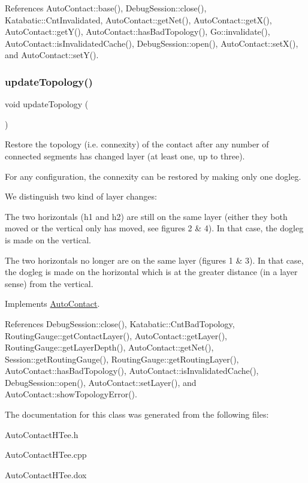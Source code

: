 References Auto\+Contact\+::base(), Debug\+Session\+::close(), Katabatic\+::\+Cnt\+Invalidated, Auto\+Contact\+::get\+Net(), Auto\+Contact\+::get\+X(), Auto\+Contact\+::get\+Y(), Auto\+Contact\+::has\+Bad\+Topology(), Go\+::invalidate(), Auto\+Contact\+::is\+Invalidated\+Cache(), Debug\+Session\+::open(), Auto\+Contact\+::set\+X(), and Auto\+Contact\+::set\+Y().

\mbox{\label{classKatabatic_1_1AutoContactHTee_af5bf1f5e71204ef84346e4e036175431}} 
\subsubsection{\texorpdfstring{update\+Topology()}{updateTopology()}}
{\footnotesize\ttfamily void update\+Topology (\begin{DoxyParamCaption}{ }\end{DoxyParamCaption})\hspace{0.3cm}{\ttfamily [virtual]}}

Restore the topology (i.\+e. connexity) of the contact after any number of connected segments has changed layer (at least one, up to three).

For any configuration, the connexity can be restored by making only one dogleg.

We distinguish two kind of layer changes\+:
\begin{DoxyEnumerate}
\item The two horizontals ({\ttfamily h1} and {\ttfamily h2}) are still on the same layer (either they both moved or the vertical only has moved, see figures 2 \& 4). In that case, the dogleg is made on the vertical.
\item The two horizontals no longer are on the same layer (figures 1 \& 3). In that case, the dogleg is made on the horizontal which is at the greater distance (in a layer sense) from the vertical.
\end{DoxyEnumerate}

 

Implements \mbox{\hyperlink{classKatabatic_1_1AutoContact_a690764ddc997fe9766a79c4b8e0c3e2f}{Auto\+Contact}}.



References Debug\+Session\+::close(), Katabatic\+::\+Cnt\+Bad\+Topology, Routing\+Gauge\+::get\+Contact\+Layer(), Auto\+Contact\+::get\+Layer(), Routing\+Gauge\+::get\+Layer\+Depth(), Auto\+Contact\+::get\+Net(), Session\+::get\+Routing\+Gauge(), Routing\+Gauge\+::get\+Routing\+Layer(), Auto\+Contact\+::has\+Bad\+Topology(), Auto\+Contact\+::is\+Invalidated\+Cache(), Debug\+Session\+::open(), Auto\+Contact\+::set\+Layer(), and Auto\+Contact\+::show\+Topology\+Error().



The documentation for this class was generated from the following files\+:\begin{DoxyCompactItemize}
\item 
Auto\+Contact\+H\+Tee.\+h\item 
Auto\+Contact\+H\+Tee.\+cpp\item 
Auto\+Contact\+H\+Tee.\+dox\end{DoxyCompactItemize}
